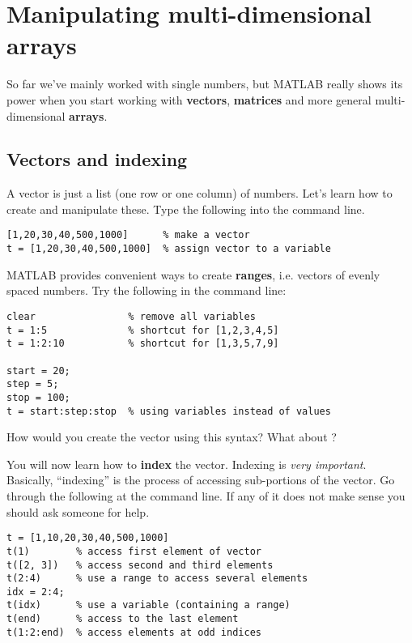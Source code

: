 \documentclass{article}
\begin{document}
\section{Manipulating multi-dimensional arrays}

So far we've mainly worked with single numbers, but MATLAB really shows its power when you start working with \textbf{vectors}, \textbf{matrices} and more general multi-dimensional \textbf{arrays}.

\subsection*{Vectors and indexing}

A vector is just a list (one row or one column) of numbers.
Let's learn how to create and manipulate these.
Type the following into the command line.
\begin{lstlisting}
[1,20,30,40,500,1000]      % make a vector
t = [1,20,30,40,500,1000]  % assign vector to a variable
\end{lstlisting}

MATLAB provides convenient ways to create \textbf{ranges}, i.e. vectors of evenly spaced numbers.
Try the following in the command line:
\begin{lstlisting}
clear                % remove all variables
t = 1:5              % shortcut for [1,2,3,4,5]
t = 1:2:10           % shortcut for [1,3,5,7,9]

start = 20;
step = 5;
stop = 100;
t = start:step:stop  % using variables instead of values
\end{lstlisting}
How would you create the vector \mcode{[5,8,11,14]} using this syntax? What about \mcode{[-1,-2,-3,-4]}?

You will now learn how to \textbf{index} the vector.
Indexing is \emph{very important}.
Basically, ``indexing'' is the process of accessing sub-portions of the vector.
Go through the following at the command line.
If any of it does not make sense you should ask someone for help.
\begin{lstlisting}
t = [1,10,20,30,40,500,1000]
t(1)        % access first element of vector
t([2, 3])   % access second and third elements
t(2:4)      % use a range to access several elements
idx = 2:4;
t(idx)      % use a variable (containing a range)
t(end)      % access to the last element
t(1:2:end)  % access elements at odd indices
\end{lstlisting}
\end{document}
